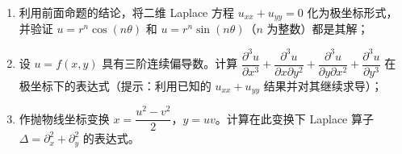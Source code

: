 \documentclass[lang=cn,11pt]{elegantbook}
\begin{document}
\begin{exercise}[坐标变换]
\begin{enumerate}
  \item[(1)] 利用前面命题的结论，将二维 Laplace 方程 $u_{xx}+u_{yy}=0$ 化为极坐标形式，并验证 $u=r^n\cos(n\theta)$ 和 $u=r^n\sin(n\theta)$（$n$ 为整数）都是其解；
  \item[(2)] 设 $u=f(x,y)$ 具有三阶连续偏导数。计算 $\dfrac{\partial^3 u}{\partial x^3}+\dfrac{\partial^3 u}{\partial x\partial y^2} +\dfrac{\partial^3 u}{\partial y\partial x^2}+\dfrac{\partial^3 u}{\partial y^3}$ 在极坐标下的表达式（提示：利用已知的 $u_{xx}+u_{yy}$ 结果并对其继续求导）；
  \item[(3)] 作抛物线坐标变换 $x=\dfrac{u^2-v^2}{2}$，$y=uv$。计算在此变换下 Laplace 算子 $\Delta=\partial_x^2+\partial_y^2$ 的表达式。
\end{enumerate}
\end{exercise}
\end{document}
